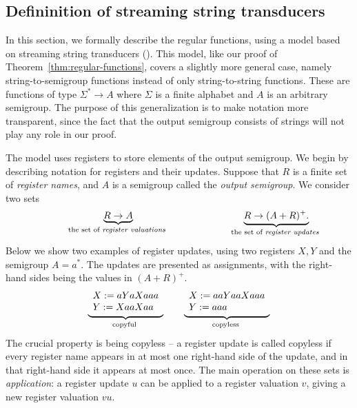 \subsection{Defininition of streaming string transducers}
\label{sec:sst-definition}
In this section, we formally describe the regular functions, using a model based on streaming string transducers (\sst).  This model, like our proof of Theorem~\ref{thm:regular-functions}, covers a slightly more general case, namely string-to-semigroup functions instead of only string-to-string functions. These are functions of type $\Sigma^* \to A$ where $\Sigma$ is a finite alphabet and $A$ is an arbitrary semigroup.  The purpose of this generalization is to make notation more transparent, since the fact that the output semigroup consists of strings will not play any role in our proof.

The model uses registers to store elements of the output semigroup. We begin by describing notation for registers and their updates. Suppose that $R$ is a finite set of \emph{register names}, and $A$ is a semigroup called the \emph{output semigroup}. We consider two sets 
\begin{align*}
\hspace{2cm}
    \myunderbrace{R \to A}{the set of \emph{register valuations}} 
    \hspace{4cm}
    \myunderbrace{R \to (A+R)^+.}{the set of \emph{register updates}}
\end{align*}
Below we show two examples of register updates, using two registers $X,Y$ and the semigroup $A = a^*$.  The updates are presented as assignments, with the right-hand sides being the values in $(A+R)^+$.
\begin{align*}
    \myunderbrace{
    \begin{array}{l}
        X:= aYaXaaa\\
    Y:= XaaXaa
    \end{array}
    }{copyful}
    \qquad 
    \myunderbrace{
    \begin{array}{l}
        X:= aaYaaXaaa\\
    Y:= aaa
    \end{array}
    }{copyless}
    \end{align*}
The crucial property is being copyless -- a register update is called copyless if every register name appears in at most one right-hand side of the update, and in that right-hand side it appears at most once. 
The main operation on these sets is \emph{application}: a register update $u$
can be applied to a register valuation $v$, giving a new register valuation $vu$. 



